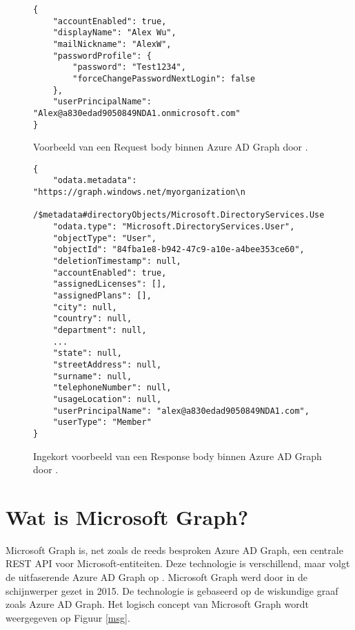 \begin{figure}[h!]
    \scriptsize
    \begin{verbatim}
{
    "accountEnabled": true,
    "displayName": "Alex Wu",
    "mailNickname": "AlexW",
    "passwordProfile": {
        "password": "Test1234",
        "forceChangePasswordNextLogin": false
    },
    "userPrincipalName": "Alex@a830edad9050849NDA1.onmicrosoft.com"
}
    \end{verbatim}
    \caption[Voorbeeld Request body Azure AD Graph]{Voorbeeld van een Request body binnen Azure \ac{AD} Graph door \textcite{Microsoft2015}.}
    \label{hreqb}
\end{figure}

\begin{figure}[h!]
    \scriptsize
    \begin{verbatim}
{
    "odata.metadata": "https://graph.windows.net/myorganization\n
    /$metadata#directoryObjects/Microsoft.DirectoryServices.User/@Element",
    "odata.type": "Microsoft.DirectoryServices.User",
    "objectType": "User",
    "objectId": "84fba1e8-b942-47c9-a10e-a4bee353ce60",
    "deletionTimestamp": null,
    "accountEnabled": true,
    "assignedLicenses": [],
    "assignedPlans": [],
    "city": null,
    "country": null,
    "department": null,
    ...
    "state": null,
    "streetAddress": null,
    "surname": null,
    "telephoneNumber": null,
    "usageLocation": null,
    "userPrincipalName": "alex@a830edad9050849NDA1.com",
    "userType": "Member"
}
    \end{verbatim}
    \caption[Voorbeeld Response body Azure AD Graph]{Ingekort voorbeeld van een Response body binnen Azure \ac{AD} Graph door \textcite{Microsoft2015}.}
    \label{hresb}
\end{figure}


\section{Wat is Microsoft Graph?}


Microsoft Graph is, net zoals de reeds besproken Azure \Ac{AD} Graph, een centrale \ac{REST} \ac{API} voor Microsoft-entiteiten. Deze technologie is verschillend, maar volgt de uitfaserende Azure \ac{AD} Graph op \autocite{Microsoft2023n}. Microsoft Graph werd door \textcite{Microsoft2015a} in de schijnwerper gezet in 2015. De technologie is gebaseerd op de wiskundige graaf zoals Azure \Ac{AD} Graph. Het logisch concept van Microsoft Graph wordt weergegeven op Figuur \ref{msg}. \\


